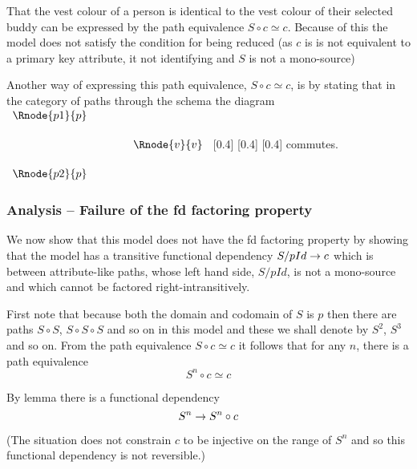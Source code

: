 That the  vest colour  of a person is 
identical to the vest colour of their selected buddy can be expressed by the path equivalence $S \circ c \simeq c$. Because of this the model does not satisfy the condition for being reduced (as $c$ is 
is not equivalent to a primary key attribute, it not 
identifying and $S$ is not a mono-source) 
\begin{categoricalaside}
Another way of expressing this 
path equivalence, $S \circ c \simeq c$, is by stating that in the category of paths through the schema  the diagram
$
\begin{array}{c p{0.75cm} c}
   \Rnode{p1}{p}  & &                  \\[0.5cm]
	                 & &    \Rnode{v}{v} \\[0.5cm]
   \Rnode{p2}{p}  & &
			
\end{array}
$
[0.4]
[0.4]
[0.4]
commutes. 
\end{categoricalaside}

\subsubsection{Analysis -- Failure of the fd factoring property}
We now show that this model does not have the fd factoring property by showing that
the model has a transitive functional dependency $S/pId \rightarrow c$ which is between
attribute-like paths, whose left hand side, $S/pId$, is not a mono-source and  which cannot be factored right-intransitively.

First note that because both the domain and  codomain of $S$ is $p$ then there are paths $S \circ S$, $S \circ S \circ S$ 
and so on in this model and these we shall denote by $S^2$, $S^3$ and so on. 
From the path equivalence $S \circ c \simeq c$ it follows that for any $n$, there is
a path equivalence 
\begin{equation}
\label{tspSncSIMEQc}
S^n \circ c \simeq c
\end{equation}

By lemma  there is a functional dependency
\begin{equation}
\label{tspSc}
S^n \rightarrow S^n \circ c
\end{equation}

(The situation does not constrain $c$ to be injective on the range of $S^n$ and so this functional dependency is not reversible.)

